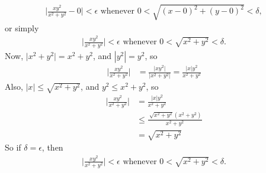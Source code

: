 \begin{enumerate}
\begin{align*}
 \Big|  \frac{xy^2}{x^2+y^2} - 0 \Big| < \epsilon \text{  whenever  } 0 < \sqrt{(x-0)^2 + (y-0)^2} < \delta ,
\end{align*}
or simply
\begin{align*}
 \Big|  \frac{xy^2}{x^2+y^2} \Big| < \epsilon \text{  whenever  } 0 < \sqrt{x^2 + y^2} < \delta .
\end{align*}
Now, $\big| x^2 + y^2\big| = x^2 + y^2$, and $|y^2| = y^2$, so
\begin{align*}
 \Big|  \frac{xy^2}{x^2+y^2} \Big| &=  \frac{ \big|xy^2 \big|}{ \big|x^2+y^2 \big|}  =   \frac{ \big|x\big|y^2 }{ x^2+y^2 }
\end{align*}
Also, $|x| \le \sqrt{x^2+y^2}$, and $y^2 \le x^2+y^2$, so
\begin{align*}
 \Big|  \frac{xy^2}{x^2+y^2} \Big| 
 &=  \frac{ \big|x\big|y^2 }{ x^2+y^2 }\\
 &\le \frac{ \ \sqrt{x^2+y^2} ( x^2+y^2 ) }{ x^2+y^2 }\\
 &= \sqrt{x^2+y^2}
\end{align*}
So if $\delta = \epsilon$, then 
\begin{align*}
 \Big|  \frac{xy^2}{x^2+y^2} \Big| < \epsilon \text{  whenever  } 0 < \sqrt{x^2 + y^2} < \delta .
\end{align*}

\end{enumerate}

